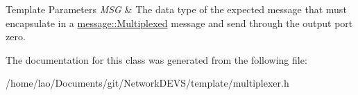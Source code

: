 \begin{DoxyTemplParams}{Template Parameters}
{\em M\+SG} & The data type of the expected message that must encapsulate in a \hyperlink{structmessage_1_1Multiplexed}{message\+::\+Multiplexed} message and send through the output port zero. \\
\hline
\end{DoxyTemplParams}


The documentation for this class was generated from the following file\+:\begin{DoxyCompactItemize}
\item 
/home/lao/\+Documents/git/\+Network\+D\+E\+V\+S/template/multiplexer.\+h\end{DoxyCompactItemize}
